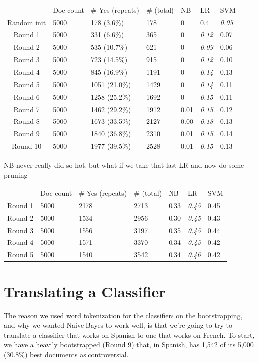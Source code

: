 \documentclass[11pt]{article} %
\begin{document}
\begin{tabular}{|c|*{6}{l|}}
\rowcolor{gray!50} & Doc count & \# Yes (repeats) & \# (total) & NB & LR & SVM \\
Random init & 5000 & 178 (3.6\%) & 178 & 0 & 0.4 & \emph{0.05} \\
Round 1 & 5000 & 331 (6.6\%) & 365 & 0 & \emph{0.12} & 0.07 \\
Round 2 & 5000 & 535 (10.7\%) & 621 & 0 & \emph{0.09} & 0.06 \\
Round 3 & 5000 & 723 (14.5\%) & 915 & 0 & \emph{0.12} & 0.10 \\
Round 4 & 5000 & 845 (16.9\%) & 1191 & 0 & \emph{0.14}& 0.13\\
Round 5 & 5000 & 1051 (21.0\%) & 1429 & 0 & \emph{0.14} & 0.11\\
Round 6 & 5000 & 1258 (25.2\%) & 1692 & 0 & \emph{0.15} & 0.11\\
Round 7 & 5000 & 1462 (29.2\%) & 1912 & 0.01 & \emph{0.15} & 0.12\\
Round 8 & 5000 & 1673 (33.5\%) & 2127 & 0.00 & \emph{0.18} & 0.13\\
Round 9 & 5000 & 1840 (36.8\%) & 2310 & 0.01 & \emph{0.15} & 0.14\\
Round 10 & 5000 & 1977 (39.5\%) & 2528 & 0.01 & \emph{0.15} & 0.13 \\
\end{tabular}
NB never really did so hot, but what if we take that last LR and now do some pruning\\
\begin{tabular}{|c|*{6}{l}}
\rowcolor{gray!50} & Doc count & \# Yes (repeats) & \# (total) & NB & LR & SVM \\
Round 1 & 5000 & 2178 & 2713 & 0.33 & \emph{0.45} & 0.45 \\
Round 2 & 5000 & 1534 & 2956 & 0.30 & \emph{0.45} & 0.43 \\
Round 3 & 5000 & 1556 & 3197 & 0.35 & \emph{0.45} & 0.44 \\
Round 4 & 5000 & 1571 & 3370 & 0.34 & \emph{0.45} & 0.42 \\
Round 5 & 5000 & 1540 & 3542 & 0.34 & \emph{0.46} & 0.42
\end{tabular}




\section{Translating a Classifier}
The reason we used word tokenization for the classifiers on the bootstrapping, and why we wanted Naive Bayes to work well, is that we're going to try to translate a classifier that works on Spanish to one that works on French. To start, we have a heavily bootstrapped (Round 9) that, in Spanish, has 1,542 of its 5,000 (30.8\%) best documents as controversial.
\end{document}
